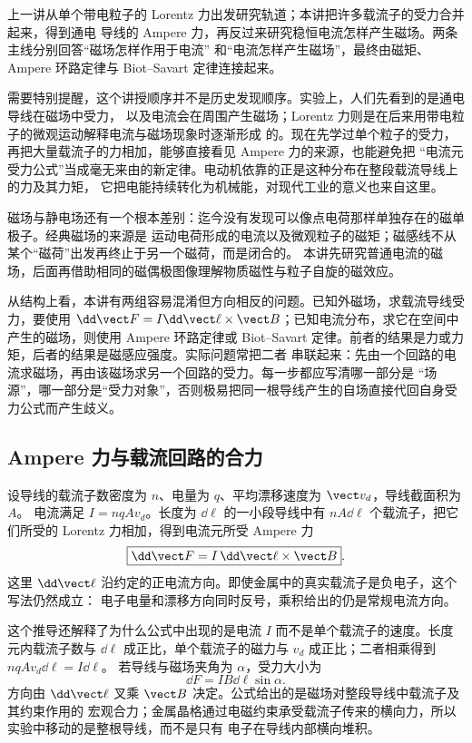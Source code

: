 上一讲从单个带电粒子的 Lorentz 力出发研究轨道；本讲把许多载流子的受力合并起来，得到通电
导线的 Ampere 力，再反过来研究稳恒电流怎样产生磁场。两条主线分别回答“磁场怎样作用于电流”
和“电流怎样产生磁场”，最终由磁矩、Ampere 环路定律与 Biot--Savart 定律连接起来。

需要特别提醒，这个讲授顺序并不是历史发现顺序。实验上，人们先看到的是通电导线在磁场中受力，
以及电流会在周围产生磁场；Lorentz 力则是在后来用带电粒子的微观运动解释电流与磁场现象时逐渐形成
的。现在先学过单个粒子的受力，再把大量载流子的力相加，能够直接看见 Ampere 力的来源，也能避免把
“电流元受力公式”当成毫无来由的新定律。电动机依靠的正是这种分布在整段载流导线上的力及其力矩，
它把电能持续转化为机械能，对现代工业的意义也来自这里。

磁场与静电场还有一个根本差别：迄今没有发现可以像点电荷那样单独存在的磁单极子。经典磁场的来源是
运动电荷形成的电流以及微观粒子的磁矩；磁感线不从某个“磁荷”出发再终止于另一个磁荷，而是闭合的。
本讲先研究普通电流的磁场，后面再借助相同的磁偶极图像理解物质磁性与粒子自旋的磁效应。

从结构上看，本讲有两组容易混淆但方向相反的问题。已知外磁场，求载流导线受力，要使用
$\dd\vect F=I\dd\vect\ell\times\vect B$；已知电流分布，求它在空间中产生的磁场，则使用 Ampere
环路定律或 Biot--Savart 定律。前者的结果是力或力矩，后者的结果是磁感应强度。实际问题常把二者
串联起来：先由一个回路的电流求磁场，再由该磁场求另一个回路的受力。每一步都应写清哪一部分是
“场源”，哪一部分是“受力对象”，否则极易把同一根导线产生的自场直接代回自身受力公式而产生歧义。

\subsection*{Ampere 力与载流回路的合力}

设导线的载流子数密度为 $n$、电量为 $q$、平均漂移速度为 $\vect v_d$，导线截面积为 $A$。
电流满足 $I=nqAv_d$。长度为 $\dd\ell$ 的一小段导线中有 $nA\dd\ell$ 个载流子，把它们所受的
Lorentz 力相加，得到电流元所受 Ampere 力
\begin{equation}
  \boxed{\dd\vect F=I\,\dd\vect\ell\times\vect B}.
\end{equation}
这里 $\dd\vect\ell$ 沿约定的正电流方向。即使金属中的真实载流子是负电子，这个写法仍然成立：
电子电量和漂移方向同时反号，乘积给出的仍是常规电流方向。

这个推导还解释了为什么公式中出现的是电流 $I$ 而不是单个载流子的速度。长度元内载流子数与
$\dd\ell$ 成正比，单个载流子的磁力与 $v_d$ 成正比；二者相乘得到 $nqAv_d\dd\ell=I\dd\ell$。
若导线与磁场夹角为 $\alpha$，受力大小为
\begin{equation}
  \dd F=IB\dd\ell\sin\alpha.
\end{equation}
方向由 $\dd\vect\ell$ 叉乘 $\vect B$ 决定。公式给出的是磁场对整段导线中载流子及其约束作用的
宏观合力；金属晶格通过电磁约束承受载流子传来的横向力，所以实验中移动的是整根导线，而不是只有
电子在导线内部横向堆积。

